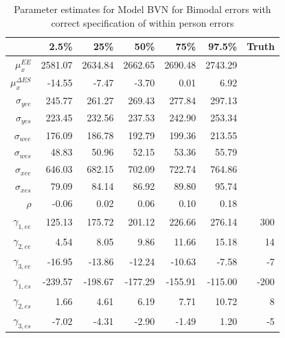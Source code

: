 \documentclass[11pt]{article}\usepackage[]{graphicx}\usepackage[]{color}
\begin{document}
\begin{table}[ht]
\centering
\begin{tabular}{rrrrrr|r}
  \hline
 & 2.5\% & 25\% & 50\% & 75\% & 97.5\% & Truth \\
  \hline
$\mu_x^{EE}$ & 2581.07 & 2634.84 & 2662.65 & 2690.48 & 2743.29 \\ 
  $\mu_x^{\Delta ES}$ & -14.55 & -7.47 & -3.70 & 0.01 & 6.92 \\ 
  $\sigma_{yee}$ & 245.77 & 261.27 & 269.43 & 277.84 & 297.13 \\ 
  $\sigma_{yes}$ & 223.45 & 232.56 & 237.53 & 242.90 & 253.34 \\ 
  $\sigma_{wee}$ & 176.09 & 186.78 & 192.79 & 199.36 & 213.55 \\ 
  $\sigma_{wes}$ & 48.83 & 50.96 & 52.15 & 53.36 & 55.79 \\ 
  $\sigma_{xee}$ & 646.03 & 682.15 & 702.09 & 722.74 & 764.86 \\ 
  $\sigma_{xes}$ & 79.09 & 84.14 & 86.92 & 89.80 & 95.74 \\ 
  $\rho$ & -0.06 & 0.02 & 0.06 & 0.10 & 0.18 \\ 
  $\gamma_{1,ee}$ & 125.13 & 175.72 & 201.12 & 226.66 & 276.14 & 300 \\ 
  $\gamma_{2,ee}$ & 4.54 & 8.05 & 9.86 & 11.66 & 15.18 & 14\\ 
  $\gamma_{3,ee}$ & -16.95 & -13.86 & -12.24 & -10.63 & -7.58 & -7 \\ 
  $\gamma_{1,es}$ & -239.57 & -198.67 & -177.29 & -155.91 & -115.00 & -200 \\ 
  $\gamma_{2,es}$ & 1.66 & 4.61 & 6.19 & 7.71 & 10.72 & 8\\ 
  $\gamma_{3,es}$ & -7.02 & -4.31 & -2.90 & -1.49 & 1.20 & -5\\ 
   \hline
\end{tabular}
\caption{Parameter estimates for Model BVN for Bimodal errors with correct specification of within person errors}
\label{mbvnbwpestimates}
\end{table}
\end{document}
